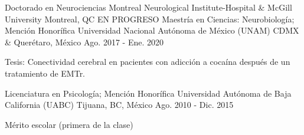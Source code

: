 \begin{cventries}
    \cventry
      {Doctorado en Neurociencias}
      {Montreal Neurological Institute-Hospital \& McGill University}
      {Montreal, QC}
      {EN PROGRESO}
      {}
    \cventry
      {Maestría en Ciencias: Neurobiología; Mención Honorífica}
      {Universidad Nacional Autónoma de México (UNAM)}
      {CDMX \& Querétaro, México}
      {Ago. 2017 - Ene. 2020}
      {
        \begin{cvitems}
          \item {Tesis: Conectividad cerebral en pacientes con adicción a cocaína después de un tratamiento de EMTr.}
        \end{cvitems}
      }
    \cventry
      {Licenciatura en Psicología; Mención Honorífica}
      {Universidad Autónoma de Baja California (UABC)}
      {Tijuana, BC, México}
      {Ago. 2010 - Dic. 2015}
      {
        \begin{cvitems}
          \item {Mérito escolar (primera de la clase)}
        \end{cvitems}
      }
\end{cventries}
